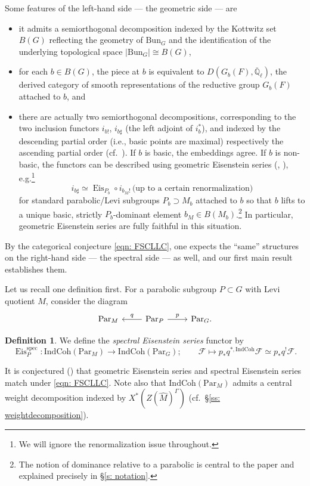 \documentclass{amsart}
\theoremstyle{definition}
\newtheorem{definition}[theorem]{Definition}
\theoremstyle{remark}
\numberwithin{equation}{section}
\newcommand{\ov}{\overline}
\newcommand{\mc}{\mathcal}
\newcommand{\Q}{\mathbb{Q}}
\newcommand{\spec}{\mathrm{spec}}
\newcommand{\wh}{\widehat}
\newcommand{\Bun}{\mathrm{Bun}}
\newcommand{\Par}{\mathrm{Par}}
\newcommand{\IndCoh}{\mathrm{IndCoh}}
\DeclareMathOperator{\Eis}{\mathrm{Eis}}
\begin{document}
Some features of the left-hand side --- the geometric side --- are 
\begin{itemize}
    \item it admits a semiorthogonal decomposition indexed by the Kottwitz set $B(G)$ reflecting the geometry of $\Bun_G$ and the identification of the underlying topological space $\lvert \Bun_G\rvert \cong B(G)$,
    \item for each $b\in B(G)$, the piece at $b$ is equivalent to $D(G_b(F), \ov{\Q}_{\ell})$, the derived category of smooth representations of the reductive group $G_b(F)$ attached to $b$, and
    \item there are actually two semiorthogonal decompositions, corresponding to the two inclusion functors $i_{b!}$, $i_{b\sharp}$ (the left adjoint of $i_b^*$), and indexed by the descending partial order (i.e., basic points are maximal) respectively the ascending partial order (cf.~\cite[\S 9.0.2]{GHILZ}). If $b$ is basic, the embeddings agree. If $b$ is non-basic, the functors can be described using geometric Eisenstein series (\cite[Corollary 2.2.5]{HHS1}, \cite[Lemma 2.9]{Takayasecondadjointness}), e.g.\footnote{We will ignore the renormalization issue throughout.}
    \begin{equation*}
        i_{b\sharp} \simeq \Eis_{P_b} \circ i_{b_M!}\,\text{(up to a certain renormalization)}
    \end{equation*}
    for standard parabolic/Levi subgroups $P_b\supset M_b$ attached to $b$ so that $b$ lifts to a unique basic, strictly $P_b$-dominant element $b_M \in B(M_b)$.\footnote{The notion of dominance relative to a parabolic is central to the paper and explained precisely in \S \ref{s: notation}.}
    In particular, geometric Eisenstein series are fully faithful in this situation.  
\end{itemize}

By the categorical conjecture \eqref{eqn: FSCLLC}, one expects the ``same'' structures on the right-hand side --- the spectral side --- as well, and our first main result establishes them. 

Let us recall one definition first. For a parabolic subgroup $P \subset G$ with Levi quotient $M$, consider the diagram
\begin{equation*}
    \begin{tikzcd}
        \Par_M & \Par_P \arrow[l, swap,  "q"] \arrow[r, "p"] & \Par_G. 
    \end{tikzcd}
\end{equation*}
\begin{definition}
We define the \emph{spectral Eisenstein series} functor by
\begin{equation*}
    \Eis^{\spec}_P\colon \IndCoh(\Par_M) \rightarrow \IndCoh(\Par_G); \qquad \mc{F} \mapsto p_{\ast}q^{\ast, \IndCoh} \mc{F}\simeq p_* q^! \mc{F}.
\end{equation*}
\end{definition}
It is conjectured (\cite[Conjecture 1.6.2, Proposition 6.3.2]{HansenMann}) that geometric Eisenstein series and spectral Eisenstein series match under \eqref{eqn: FSCLLC}. Note also that $\IndCoh(\Par_M)$ admits a central weight decomposition indexed by $X^{\ast}(Z(\wh{M})^{\Gamma})$ (cf.~\S \ref{ss: weightdecomposition}).
\end{document}

